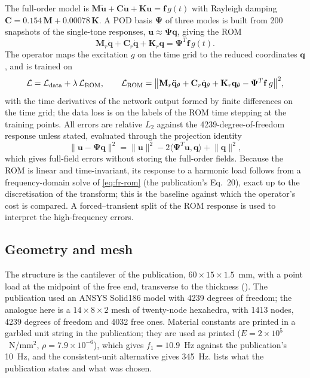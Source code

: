 The full-order model is $\mathbf M\ddot{\mathbf u}+\mathbf C\dot{\mathbf u}+\mathbf K\mathbf u=\mathbf f\,g(t)$ with Rayleigh damping $\mathbf C=0.154\,\mathbf M+0.00078\,\mathbf K$. A POD basis $\boldsymbol\Psi$ of three modes is built from 200 snapshots of the single-tone responses, $\mathbf u\approx\boldsymbol\Psi\mathbf q$, giving the ROM
\begin{equation}\label{eq:fr-rom}
\mathbf M_r\ddot{\mathbf q}+\mathbf C_r\dot{\mathbf q}+\mathbf K_r\mathbf q=\boldsymbol\Psi^{T}\mathbf f\,g(t).
\end{equation}
The operator maps the excitation $g$ on the time grid to the reduced coordinates $\mathbf q$, and is trained on
\begin{equation}\label{eq:fr-loss}
\mathcal L=\mathcal L_{\rm data}+\lambda\,\mathcal L_{\rm ROM},\qquad
\mathcal L_{\rm ROM}=\big\lVert\mathbf M_r\ddot{\mathbf q}_\theta+\mathbf C_r\dot{\mathbf q}_\theta+\mathbf K_r\mathbf q_\theta-\boldsymbol\Psi^{T}\mathbf f\,g\big\rVert^2,
\end{equation}
with the time derivatives of the network output formed by finite differences on the time grid; the data loss is on the labels of the ROM time stepping at the training points. All errors are relative $L_2$ against the 4239-degree-of-freedom response unless stated, evaluated through the projection identity
\begin{equation}\label{eq:fr-err}
\lVert\mathbf u-\boldsymbol\Psi\mathbf q\rVert^2=\lVert\mathbf u\rVert^2-2\langle\boldsymbol\Psi^{T}\mathbf u,\mathbf q\rangle+\lVert\mathbf q\rVert^2,
\end{equation}
which gives full-field errors without storing the full-order fields. Because the ROM is linear and time-invariant, its response to a harmonic load follows from a frequency-domain solve of \cref{eq:fr-rom} (the publication's Eq.~20), exact up to the discretisation of the transform; this is the baseline against which the operator's cost is compared. A forced--transient split of the ROM response is used to interpret the high-frequency errors.

\subsection*{Geometry and mesh}

The structure is the cantilever of the publication, $60\times15\times1.5$~mm, with a point load at the midpoint of the free end, transverse to the thickness (). The publication used an ANSYS Solid186 model with 4239 degrees of freedom; the analogue here is a $14\times8\times2$ mesh of twenty-node hexahedra, with 1413 nodes, 4239 degrees of freedom and 4032 free ones. Material constants are printed in a garbled unit string in the publication; they are used as printed ($E=2\times10^5$~N/mm$^2$, $\rho=7.9\times10^{-6}$), which gives $f_1=10.9$~Hz against the publication's 10~Hz, and the consistent-unit alternative gives 345~Hz.  lists what the publication states and what was chosen.


